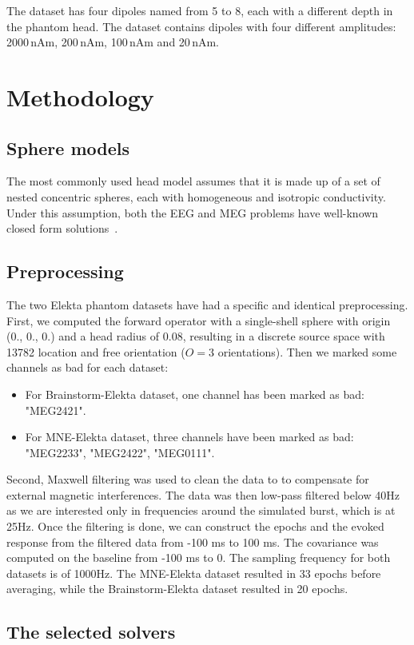 The dataset has four dipoles named from 5 to 8, each with a different depth in the phantom head. The dataset contains dipoles with four different amplitudes: 2000\,nAm, 200\,nAm, 100\,nAm and 20\,nAm.

\section{Methodology}

\subsection{Sphere models}
The most commonly used head model assumes that it is made up of a set of nested concentric spheres, each with homogeneous and isotropic conductivity. Under this assumption, both the EEG and MEG problems have well-known closed form solutions~\cite{mosher1999eeg}.

\subsection{Preprocessing}
The two Elekta phantom datasets have had a specific and identical preprocessing. First, we computed the forward operator with a single-shell sphere with origin (0., 0., 0.) and a head radius of 0.08, resulting in a discrete source space with 13782 location and free orientation ($O=3$ orientations). Then we marked some channels as bad for each dataset:
\begin{itemize}
\item For Brainstorm-Elekta dataset, one channel has been marked as bad: "MEG2421".
\item For MNE-Elekta dataset, three channels have been marked as bad: \\"MEG2233", "MEG2422", "MEG0111".
\end{itemize}
Second, Maxwell filtering was used to clean the data to to compensate for external magnetic interferences. The data was then low-pass filtered below 40Hz as we are interested only in frequencies around the simulated burst, which is at 25Hz. Once the filtering is done, we can construct the epochs and the evoked response from the filtered data from -100 ms to 100 ms. The covariance was computed on the baseline from -100 ms to 0. The sampling frequency for both datasets is of 1000Hz.
The MNE-Elekta dataset resulted in 33 epochs before averaging, while the Brainstorm-Elekta dataset resulted in 20 epochs.

\subsection{The selected solvers}
